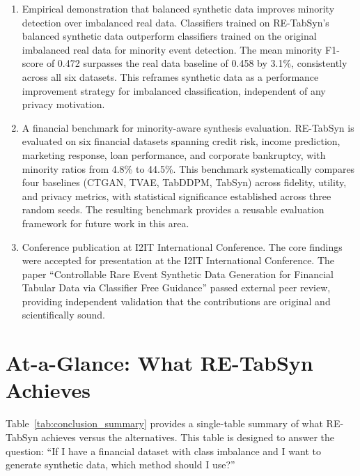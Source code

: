 \begin{enumerate}
    \item Empirical demonstration that balanced synthetic data improves minority detection over imbalanced real data. Classifiers trained on RE-TabSyn's balanced synthetic data outperform classifiers trained on the original imbalanced real data for minority event detection. The mean minority F1-score of 0.472 surpasses the real data baseline of 0.458 by 3.1\%, consistently across all six datasets. This reframes synthetic data as a performance improvement strategy for imbalanced classification, independent of any privacy motivation.

    \item A financial benchmark for minority-aware synthesis evaluation. RE-TabSyn is evaluated on six financial datasets spanning credit risk, income prediction, marketing response, loan performance, and corporate bankruptcy, with minority ratios from 4.8\% to 44.5\%. This benchmark systematically compares four baselines (CTGAN, TVAE, TabDDPM, TabSyn) across fidelity, utility, and privacy metrics, with statistical significance established across three random seeds. The resulting benchmark provides a reusable evaluation framework for future work in this area.

    \item Conference publication at I2IT International Conference. The core findings were accepted for presentation at the I2IT International Conference. The paper ``Controllable Rare Event Synthetic Data Generation for Financial Tabular Data via Classifier Free Guidance'' passed external peer review, providing independent validation that the contributions are original and scientifically sound.
\end{enumerate}

\section{At-a-Glance: What RE-TabSyn Achieves}

Table~\ref{tab:conclusion_summary} provides a single-table summary of what RE-TabSyn achieves versus the alternatives. This table is designed to answer the question: ``If I have a financial dataset with class imbalance and I want to generate synthetic data, which method should I use?''

\renewcommand{\arraystretch}{1.2}

